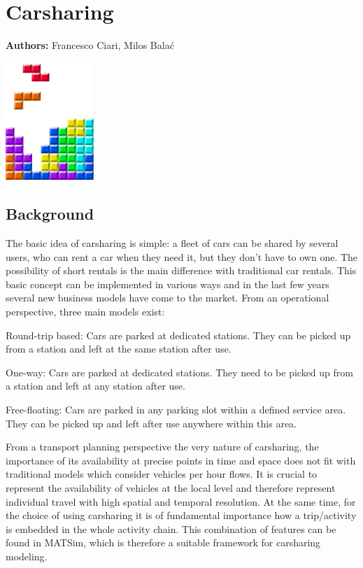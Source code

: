 \chapter{Carsharing}
\label{ch:carsharing}

\hfill \textbf{Authors:} Francesco Ciari, Milos Balać

\begin{center} \includegraphics[width=0.25\textwidth, angle=0]{figures/MATSimBook.png} \end{center}


\section{Background}
The basic idea of carsharing is simple: a fleet of cars can be shared by several users, who can rent a car when they need it, but they don’t have to own one. The possibility of short rentals is the main difference with traditional car rentals. This basic concept can be implemented in various ways and in the last few years several new business models have come to the market. From an operational perspective, three main models exist:
%
\begin{compactitem}
	\item Round-trip based: Cars are parked at dedicated stations. They can be picked up from a station and left at the same station after use.
	\item One-way: Cars are parked at dedicated stations. They need to be picked up from a station and left at any station after use.
	\item Free-floating: Cars are parked in any parking slot within a defined service area. They can be picked up and left after use anywhere within this area. 
\end{compactitem}
%
From a transport planning perspective the very nature of carsharing, the importance of its availability at precise points in time and space does not fit with traditional models which consider vehicles per hour flows. It is crucial to represent the availability of vehicles at the local level and therefore represent individual travel with high spatial and temporal resolution. At the same time, for the choice of using carsharing it is of fundamental importance how a trip/activity is embedded in the whole activity chain. This combination of features can be found in MATSim, which is therefore a suitable framework for carsharing modeling. 

